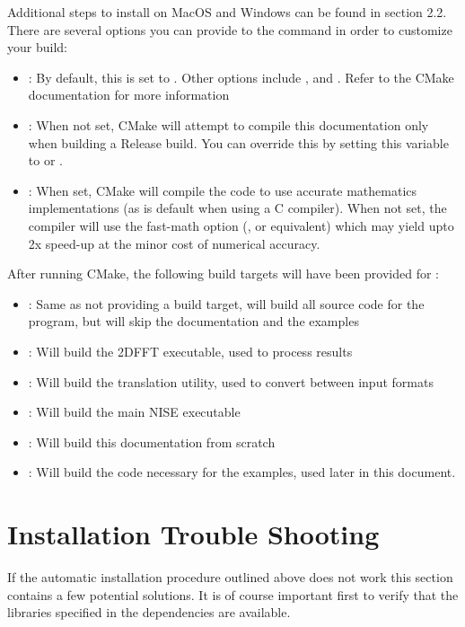 \noindent
Additional steps to install on MacOS and Windows can be found in section 2.2.\\

There are several options you can provide to the  command in order to customize your build:
\begin{itemize}
\item {}: By default, this is set to . Other options include ,  and . Refer to the CMake documentation for more information
\item {}: When not set, CMake will attempt to compile this documentation only when building a Release build. You can override this by setting this variable to  or .
\item {}: When set, CMake will compile the code to use accurate mathematics implementations (as is default when using a C compiler). When not set, the compiler will use the fast-math option (,  or equivalent) which may yield upto 2x speed-up at the minor cost of numerical accuracy.
\end{itemize}

After running CMake, the following build targets will have been provided for :
\begin{itemize}
\item {}: Same as not providing a build target, will build all source code for the program, but will skip the documentation and the examples
\item {}: Will build the 2DFFT executable, used to process results
\item {}: Will build the translation utility, used to convert between input formats
\item {}: Will build the main NISE executable
\item {}: Will build this documentation from scratch
\item {}: Will build the code necessary for the examples, used later in this document.
\end{itemize}

\section{Installation Trouble Shooting}
If the automatic installation procedure outlined above does not work this section contains a few potential solutions. It is of course important first to verify that the libraries specified in the dependencies are available.

